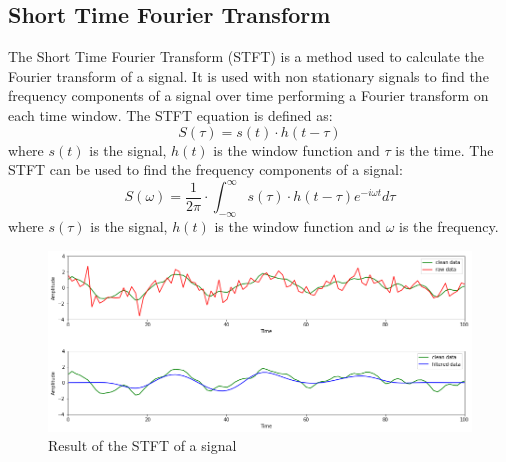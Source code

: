 \documentclass[a4paper]{sapthesis}
\begin{document}
\subsection{Short Time Fourier Transform}\label{sec:stft}
The Short Time Fourier Transform (STFT)\cite{stft}\cite{stft2}
is a method used to calculate the
Fourier transform of a signal. It is used with non stationary signals
to find the frequency components of a signal over time performing 
a Fourier transform on each time window.
The STFT equation is defined as:
\begin{equation}
\label{eq:stft}
S(\tau) = s(t) \cdot h(t-\tau)
\end{equation}
where $s(t)$ is the signal, $h(t)$ is the window function and $\tau$ is
the time. \newline
The STFT can be used to find the frequency components of a signal:
\begin{equation}
\label{eq:stft2}
S(\omega)= \frac{1}{2\pi}\cdot \int_{-\infty}^{\infty} s(\tau) \cdot h(t-\tau) e^{-i\omega t} d\tau
\end{equation}
where $s(\tau)$ is the signal, $h(t)$ is the window function and $\omega$
is the frequency. \newline
\begin{figure}[h]
  \includegraphics[scale=0.45]{stft_waves_result}
  \centering
  \caption{Result of the STFT of a signal
  }\label{fig:stft} 
  \end{figure}
\end{document}
